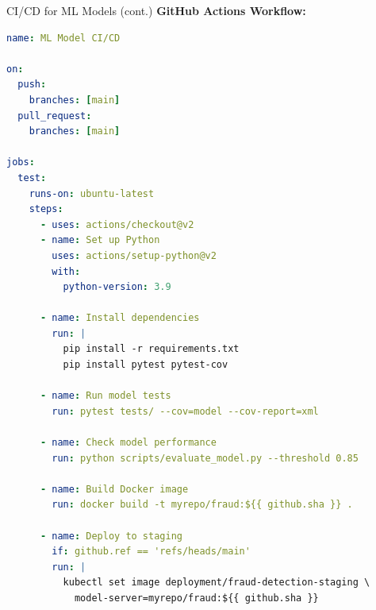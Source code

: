 \begin{frame}[fragile]{CI/CD for ML Models (cont.)}
\textbf{GitHub Actions Workflow:}
\begin{lstlisting}[language=yaml, basicstyle=\ttfamily\tiny]
name: ML Model CI/CD

on:
  push:
    branches: [main]
  pull_request:
    branches: [main]

jobs:
  test:
    runs-on: ubuntu-latest
    steps:
      - uses: actions/checkout@v2
      - name: Set up Python
        uses: actions/setup-python@v2
        with:
          python-version: 3.9

      - name: Install dependencies
        run: |
          pip install -r requirements.txt
          pip install pytest pytest-cov

      - name: Run model tests
        run: pytest tests/ --cov=model --cov-report=xml

      - name: Check model performance
        run: python scripts/evaluate_model.py --threshold 0.85

      - name: Build Docker image
        run: docker build -t myrepo/fraud:${{ github.sha }} .

      - name: Deploy to staging
        if: github.ref == 'refs/heads/main'
        run: |
          kubectl set image deployment/fraud-detection-staging \
            model-server=myrepo/fraud:${{ github.sha }}
\end{lstlisting}
\end{frame}

